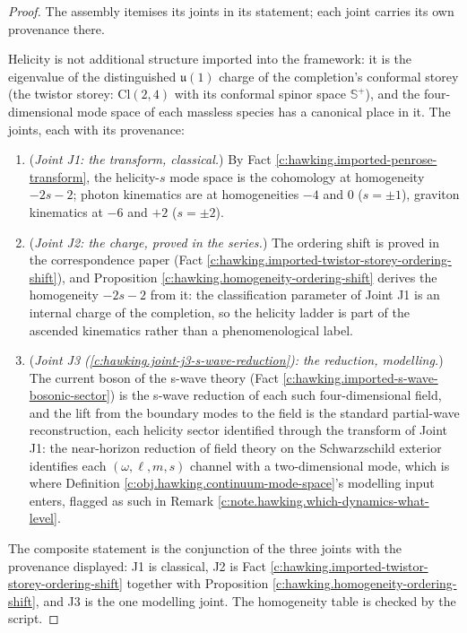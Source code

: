\documentclass[11pt]{article}
\theoremstyle{definition}
\theoremstyle{plain}
\providecommand{\CS}{}\renewcommand{\CS}{{\mathbb{S}^{+}}}
\providecommand{\Cl}{}\renewcommand{\Cl}{\mathrm{Cl}}
\begin{document}
\begin{proof}
The assembly itemises its joints in its statement; each joint carries its own provenance there.

Helicity is not additional structure imported into the framework: it is the eigenvalue of the distinguished $\mathfrak{u}(1)$ charge of the completion's conformal storey (the twistor storey: $\Cl(2,4)$ with its conformal spinor space $\CS$), and the four-dimensional mode space of each massless species has a canonical place in it. The joints, each with its provenance:
\begin{enumerate}
\item (\emph{Joint J1: the transform, classical.}) By Fact \ref{c:hawking.imported-penrose-transform}, the helicity-$s$ mode space is the cohomology at homogeneity $-2s-2$; photon kinematics are at homogeneities $-4$ and $0$ ($s = \pm1$), graviton kinematics at $-6$ and $+2$ ($s = \pm2$).
\item (\emph{Joint J2: the charge, proved in the series.}) The ordering shift is proved in the correspondence paper (Fact \ref{c:hawking.imported-twistor-storey-ordering-shift}), and Proposition \ref{c:hawking.homogeneity-ordering-shift} derives the homogeneity $-2s-2$ from it: the classification parameter of Joint J1 is an internal charge of the completion, so the helicity ladder is part of the ascended kinematics rather than a phenomenological label.
\item (\emph{Joint J3 (\ref{c:hawking.joint-j3-s-wave-reduction}): the reduction, modelling.}) The current boson of the s-wave theory (Fact \ref{c:hawking.imported-s-wave-bosonic-sector}) is the s-wave reduction of each such four-dimensional field, and the lift from the boundary modes to the field is the standard partial-wave reconstruction, each helicity sector identified through the transform of Joint J1: the near-horizon reduction of field theory on the Schwarzschild exterior identifies each $(\omega, \ell, m, s)$ channel with a two-dimensional mode, which is where Definition \ref{c:obj.hawking.continuum-mode-space}'s modelling input enters, flagged as such in Remark \ref{c:note.hawking.which-dynamics-what-level}.
\end{enumerate}
The composite statement is the conjunction of the three joints with the provenance displayed: J1 is classical, J2 is Fact \ref{c:hawking.imported-twistor-storey-ordering-shift} together with Proposition \ref{c:hawking.homogeneity-ordering-shift}, and J3 is the one modelling joint. The homogeneity table is checked by the script.

\end{proof}
\end{document}
